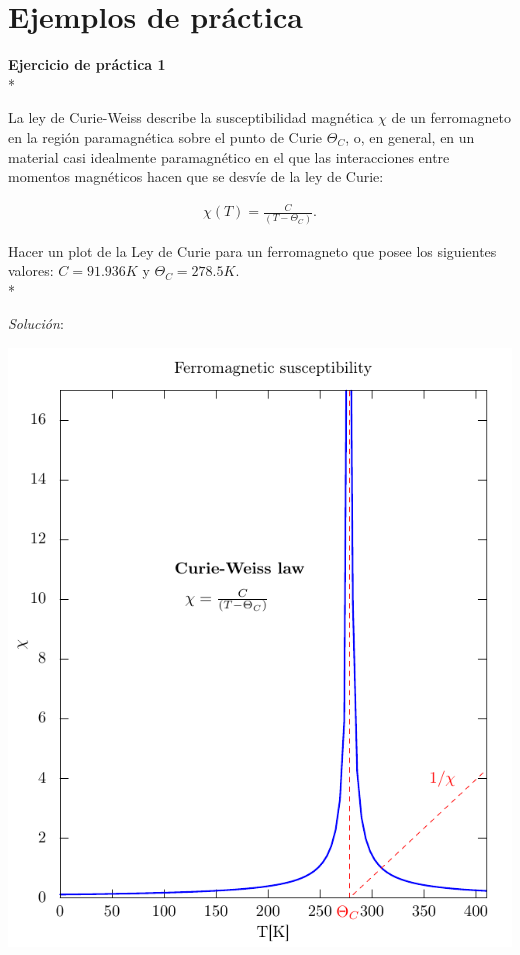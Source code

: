 \documentclass[11.5pt,a4paper]{article}
\begin{document}
\newpage
\section{Ejemplos de práctica}

\textbf{Ejercicio de práctica 1}\\*

La ley de Curie-Weiss describe la susceptibilidad magnética $\chi$ de un ferromagneto en la región paramagnética sobre el punto de Curie $\Theta_{C}$, o, en general, en un material casi idealmente paramagnético en el que las interacciones entre momentos magnéticos hacen que se desvíe de la ley de Curie: 

\begin{eqnarray*}
\chi(T) = \frac{C}{(T-\Theta_{C})}.
\end{eqnarray*}

Hacer un plot de la Ley de Curie para un ferromagneto que posee los siguientes valores: $C = 91.936 K$ y $\Theta_{C} = 278.5 K$.\\*

\textit{Solución}:

\includegraphics[scale=0.60]{ejercicio1.pdf}\\
\end{document}
